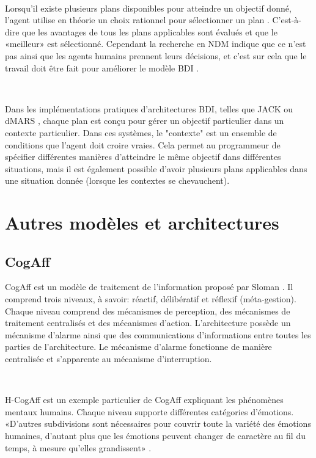 ~\par
Lorsqu'il existe plusieurs plans disponibles pour atteindre un objectif donné, l'agent utilise en théorie un choix rationnel pour sélectionner un plan \parencite{bratman1988plans}. C'est-à-dire que les avantages de tous les plans applicables sont évalués et que le «meilleur» est sélectionné. Cependant la recherche en NDM indique que ce n'est pas ainsi que les agents humains prennent leurs décisions, et c'est sur cela que le travail doit être fait pour  améliorer le modèle BDI .

~\par
Dans les implémentations pratiques d'architectures BDI, telles que JACK \parencite{jack} ou dMARS \parencite{dmars1997formal}, chaque plan est conçu pour gérer un objectif particulier dans un contexte particulier. Dans ces systèmes, le "contexte" est un ensemble de conditions que l'agent doit croire vraies. Cela permet au programmeur de spécifier différentes manières d'atteindre le même objectif dans différentes situations, mais il est également possible d'avoir plusieurs plans applicables dans une situation donnée (lorsque les contextes se chevauchent).







\section{Autres modèles et architectures}

\subsection{CogAff} \label{cogaff}

CogAff est un modèle de traitement de l'information proposé par Sloman \parencite{sloman2005architectural}. Il comprend trois niveaux, à savoir: réactif, délibératif et réflexif (méta-gestion). 
Chaque niveau comprend des mécanismes de perception, des mécanismes de traitement centralisés et des mécanismes d'action. L'architecture possède un mécanisme d'alarme ainsi que des communications d'informations entre toutes les parties de l'architecture. Le mécanisme d'alarme fonctionne de manière centralisée et s'apparente au mécanisme d'interruption.

~\par

H-CogAff est un exemple particulier de CogAff expliquant les phénomènes mentaux humains. Chaque niveau supporte différentes catégories d'émotions. «D'autres subdivisions sont nécessaires pour couvrir toute la variété des émotions humaines, d'autant plus que les émotions peuvent changer de caractère au fil du temps, à mesure qu'elles grandissent» \parencite{sloman2005architectural}.


